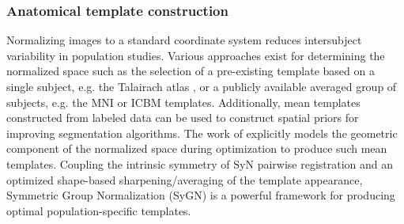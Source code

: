 \subsubsection{Anatomical template construction}

Normalizing images to a standard coordinate system
reduces intersubject variability in population studies.  Various
approaches exist for determining the normalized space such as the selection
of a pre-existing template based on a single subject, e.g. the Talairach
atlas \citep{Talairach1988}, or a publicly available averaged group of
subjects, e.g. the MNI \citep{Collins1994} or ICBM \citep{Mazziotta1995}
templates.  Additionally, mean templates constructed from labeled
data can be used to construct spatial priors for improving segmentation
algorithms.
The work of \cite{avants2010} explicitly models the geometric component of the 
normalized space during optimization to produce such mean templates.  Coupling the intrinsic symmetry of 
SyN pairwise registration \citep{avants2011} and an
optimized shape-based sharpening/averaging of the template appearance, Symmetric Group
Normalization (SyGN) is a powerful framework for producing optimal population-specific
templates.




